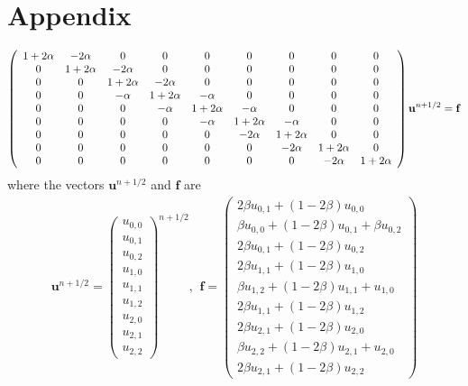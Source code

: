 \section{Appendix}
\begin{align}
  \left(\begin{array}{c c c c c c c c c}
        1+2\alpha & -2\alpha &0 &0 &0 &0 &0 &0 &0\\
        0 & 1+2\alpha & -2\alpha &0 &0 &0 &0 &0 &0\\
        0& 0 & 1+2\alpha & -2\alpha & 0 & 0 &0&0&0\\
        0& 0&-\alpha & 1+2\alpha & -\alpha & 0 & 0 &0&0\\
        0& 0&0&-\alpha & 1+2\alpha & -\alpha & 0 & 0 &0\\
        0& 0&0&0&-\alpha & 1+2\alpha & -\alpha & 0 &0\\
        0& 0 &0 &0 &0&-2\alpha & 1+2\alpha & 0&0\\
        0& 0 &0 &0 &0&0&-2\alpha & 1+2\alpha &0\\
         0&0 &0 &0&0 &0&0&-2\alpha & 1+2\alpha
       \end{array}\right)\mathbf{u}^{n+1/2} = \mathbf{f}
\end{align}
where the vectors $\mathbf{u}^{n+1/2}$ and $\mathbf{f}$ are 
\begin{align*}
\mathbf{u}^{n+1/2}= \left(\begin{array}{c}
                           u_{0,0}\\u_{0,1}\\u_{0,2}\\u_{1,0}\\u_{1,1}\\u_{1,2}\\u_{2,0}\\u_{2,1}\\u_{2,2}
                          \end{array}\right)^{n+1/2}\text{,}\;\;
\mathbf{f} = \left(\begin{array}{c}
                           2\beta u_{0,1} +(1-2\beta)u_{0,0}\\ \beta u_{0,0} +(1-2\beta)u_{0,1}+\beta u_{0,2}\\
                           2\beta u_{0,1} +(1-2\beta)u_{0,2}\\2\beta u_{1,1} +(1-2\beta)u_{1,0}\\
                           \beta u_{1,2} +(1-2\beta)u_{1,1}+u_{1,0}\\2\beta u_{1,1} +(1-2\beta)u_{1,2}\\
                           2\beta u_{2,1} +(1-2\beta)u_{2,0}\\ \beta u_{2,2} +(1-2\beta)u_{2,1}+u_{2,0}\\
                           2\beta u_{2,1} +(1-2\beta)u_{2,2}
                          \end{array}\right)
\end{align*}

